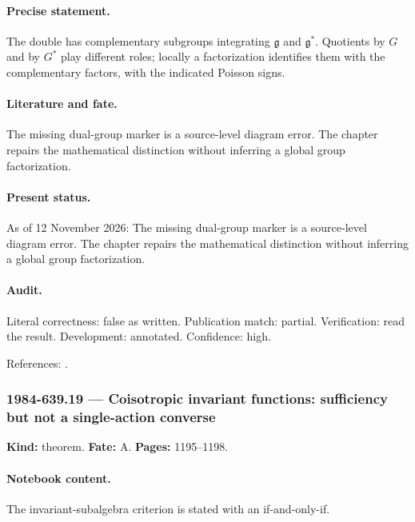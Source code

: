 \paragraph{Precise statement.} The double has complementary subgroups integrating \(\mathfrak g\) and \(\mathfrak g^*\). Quotients by \(G\) and by \(G^*\) play different roles; locally a factorization identifies them with the complementary factors, with the indicated Poisson signs.

\paragraph{Literature and fate.} The missing dual-group marker is a source-level diagram error. The chapter repairs the mathematical distinction without inferring a global group factorization.

\paragraph{Present status.} As of 12 November 2026: The missing dual-group marker is a source-level diagram error. The chapter repairs the mathematical distinction without inferring a global group factorization.

\paragraph{Audit.} Literal correctness: false as written. Publication match: partial. Verification: read the result. Development: annotated. Confidence: high.

\noindent References: \citep{semenov1985dressing}.\par

\subsubsection{1984-639.19 --- Coisotropic invariant functions: sufficiency but not a single-action converse}

\label{item:1984-639.19}

\noindent\textbf{Kind:} theorem. \textbf{Fate:} A. \textbf{Pages:} 1195--1198.\par

\paragraph{Notebook content.} The invariant-subalgebra criterion is stated with an if-and-only-if.

